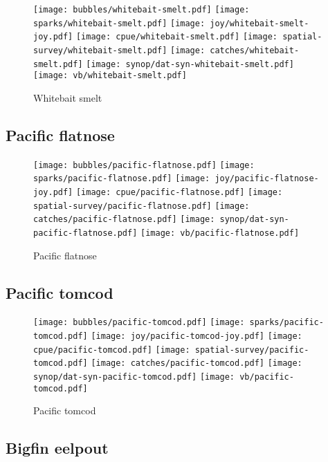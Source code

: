 \begin{figure}[htbp]
\centering
\texttt{[image: bubbles/whitebait-smelt.pdf]}
\texttt{[image: sparks/whitebait-smelt.pdf]}
\texttt{[image: joy/whitebait-smelt-joy.pdf]}
\texttt{[image: cpue/whitebait-smelt.pdf]}
\texttt{[image: spatial-survey/whitebait-smelt.pdf]}
\texttt{[image: catches/whitebait-smelt.pdf]}
\texttt{[image: synop/dat-syn-whitebait-smelt.pdf]}
\texttt{[image: vb/whitebait-smelt.pdf]}
\caption{Whitebait smelt}
\end{figure}
\clearpage
\subsection*{Pacific flatnose}

\begin{figure}[htbp]
\centering
\texttt{[image: bubbles/pacific-flatnose.pdf]}
\texttt{[image: sparks/pacific-flatnose.pdf]}
\texttt{[image: joy/pacific-flatnose-joy.pdf]}
\texttt{[image: cpue/pacific-flatnose.pdf]}
\texttt{[image: spatial-survey/pacific-flatnose.pdf]}
\texttt{[image: catches/pacific-flatnose.pdf]}
\texttt{[image: synop/dat-syn-pacific-flatnose.pdf]}
\texttt{[image: vb/pacific-flatnose.pdf]}
\caption{Pacific flatnose}
\end{figure}
\clearpage
\subsection*{Pacific tomcod}

\begin{figure}[htbp]
\centering
\texttt{[image: bubbles/pacific-tomcod.pdf]}
\texttt{[image: sparks/pacific-tomcod.pdf]}
\texttt{[image: joy/pacific-tomcod-joy.pdf]}
\texttt{[image: cpue/pacific-tomcod.pdf]}
\texttt{[image: spatial-survey/pacific-tomcod.pdf]}
\texttt{[image: catches/pacific-tomcod.pdf]}
\texttt{[image: synop/dat-syn-pacific-tomcod.pdf]}
\texttt{[image: vb/pacific-tomcod.pdf]}
\caption{Pacific tomcod}
\end{figure}
\clearpage
\subsection*{Bigfin eelpout}


